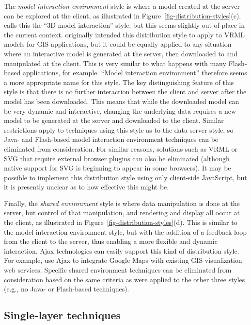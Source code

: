 \documentclass[acmnow]{acmtrans2m}
\begin{document}
The \emph{model interaction environment} style is where a model created
at the server can be explored at the client, as illustrated in
Figure~\ref{fig-distribution-styles}(c).  calls
this the ``3D model interaction'' style, but this seems slightly out of
place in the current context.  originally
intended this distribution style to apply to VRML models for GIS
applications, but it could be equally applied to any situation where an
interactive model is generated at the server, then downloaded to and
manipulated at the client. This is very similar to what happens with
many Flash-based applications, for example. ``Model interaction
environment'' therefore seems a more appropriate name for this style.
The key distinguishing feature of this style is that there is no further
interaction between the client and server after the model has been
downloaded. This means that while the downloaded model can be very
dynamic and interactive, changing the underlying data requires a new
model to be generated at the server and downloaded to the client.
Similar restrictions apply to techniques using this style as to the data
server style, so Java- and Flash-based model interaction environment
techniques can be eliminated from consideration. For similar reasons,
solutions such as VRML or SVG that require external browser plugins can
also be eliminated (although native support for SVG is beginning to
appear in some browsers). It may be possible to implement this
distribution style using only client-side JavaScript, but it is
presently unclear as to how effective this might be.

Finally, the \emph{shared environment} style is where data manipulation
is done at the server, but control of that manipulation, and rendering
and display all occur at the client, as illustrated in
Figure~\ref{fig-distribution-styles}(d). This is similar to the model
interaction environment style, but with the addition of a feedback loop
from the client to the server, thus enabling a more flexible and dynamic
interaction. Ajax technologies can easily support this kind of
distribution style. For example,  use Ajax to
integrate Google Maps with existing GIS visualization web services.
Specific shared environment techniques can be eliminated from
consideration based on the same criteria as were applied to the other
three styles (e.g., no Java- or Flash-based techniques).


\subsection{Single-layer techniques}
\label{sec-image-gen}
\end{document}
